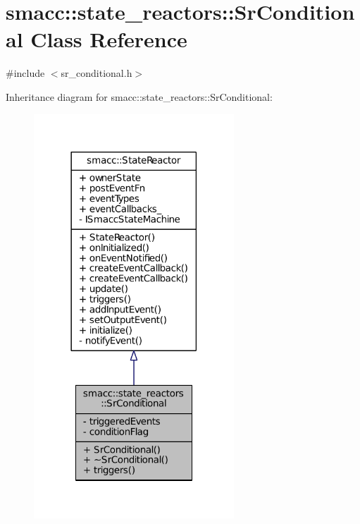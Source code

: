 \hypertarget{classsmacc_1_1state__reactors_1_1SrConditional}{}\section{smacc\+:\+:state\+\_\+reactors\+:\+:Sr\+Conditional Class Reference}
\label{classsmacc_1_1state__reactors_1_1SrConditional}


{\ttfamily \#include $<$sr\+\_\+conditional.\+h$>$}



Inheritance diagram for smacc\+:\+:state\+\_\+reactors\+:\+:Sr\+Conditional\+:
\nopagebreak
\begin{figure}[H]
\begin{center}
\leavevmode
\includegraphics[width=213pt]{classsmacc_1_1state__reactors_1_1SrConditional__inherit__graph}
\end{center}
\end{figure}


